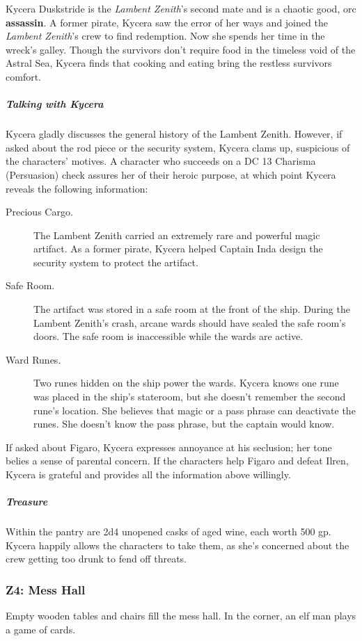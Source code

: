 \documentclass[10pt,a4paper,twoside,bg=print,twocolumn,openany,nodeprecatedcode]{dndbook}
\begin{document}
Kycera Duskstride is the \textit{Lambent Zenith}'s second mate and is a chaotic good, orc \textbf{assassin}. A former pirate, Kycera saw the error of her ways and joined the \textit{Lambent Zenith}'s crew to find redemption. Now she spends her time in the wreck's galley. Though the survivors don't require food in the timeless void of the Astral Sea, Kycera finds that cooking and eating bring the restless survivors comfort.

\subparagraph{Talking with Kycera}
Kycera gladly discusses the general history of the Lambent Zenith. However, if asked about the rod piece or the security system, Kycera clams up, suspicious of the characters' motives. A character who succeeds on a DC 13 Charisma (Persuasion) check assures her of their heroic purpose, at which point Kycera reveals the following information:


\begin{description}
\item[Precious Cargo.]
The Lambent Zenith carried an extremely rare and powerful magic artifact. As a former pirate, Kycera helped Captain Inda design the security system to protect the artifact.
\item[Safe Room.]
The artifact was stored in a safe room at the front of the ship. During the Lambent Zenith's crash, arcane wards should have sealed the safe room's doors. The safe room is inaccessible while the wards are active.
\item[Ward Runes.]
Two runes hidden on the ship power the wards. Kycera knows one rune was placed in the ship's stateroom, but she doesn't remember the second rune's location. She believes that magic or a pass phrase can deactivate the runes. She doesn't know the pass phrase, but the captain would know.
\end{description}

If asked about Figaro, Kycera expresses annoyance at his seclusion; her tone belies a sense of parental concern. If the characters help Figaro and defeat Ilren, Kycera is grateful and provides all the information above willingly.

\subparagraph{Treasure}
Within the pantry are 2d4 unopened casks of aged wine, each worth 500 gp. Kycera happily allows the characters to take them, as she's concerned about the crew getting too drunk to fend off threats.

\subsubsection{Z4: Mess Hall}
\begin{DndReadAloud}{}
Empty wooden tables and chairs fill the mess hall. In the corner, an elf man plays a game of cards.

\end{DndReadAloud}
\end{document}
